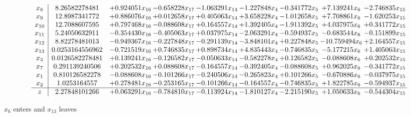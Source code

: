 \documentclass[10pt]{article}
\begin{document}
 \[\begin{array}{c| c c@{\hskip 2pt} c@{\hskip 2pt} c@{\hskip 2pt} c@{\hskip 2pt} c@{\hskip 2pt} c@{\hskip 2pt} c@{\hskip 2pt} }
 x_{8}   &  8.26582278481 & + 0.924051 x_{16} & -0.658228 x_{17} & -1.063291 x_{14} & -1.227848 x_{4} & -0.341772 x_{5} & + 7.139241 x_{6} & -2.746835 x_{15}\\
 x_{9}   &  12.8987341772 & + 0.886076 x_{16} & + 0.012658 x_{17} & + 0.405063 x_{14} & + 3.658228 x_{4} & -1.012658 x_{5} & + 7.708861 x_{6} & -1.620253 x_{15}\\
 x_{10}   &  12.7088607595 & + 0.797468 x_{16} & -0.088608 x_{17} & + 0.164557 x_{14} & + 1.392405 x_{4} & -1.911392 x_{5} & + 4.037975 x_{6} & + 0.341772 x_{15}\\
 x_{11}   &  5.24050632911 & -0.354430 x_{16} & -0.405063 x_{17} & + 0.037975 x_{14} & -2.063291 x_{4} & -0.594937 x_{5} & -0.683544 x_{6} & -0.151899 x_{15}\\
 x_{12}   &  8.82278481013 & -0.949367 x_{16} & -0.227848 x_{17} & -0.291139 x_{14} & -3.848101 x_{4} & + 0.227848 x_{5} & -10.759494 x_{6} & + 2.164557 x_{15}\\
 x_{13}   &  0.0253164556962 & -0.721519 x_{16} & + 0.746835 x_{17} & + 0.898734 x_{14} & + 4.835443 x_{4} & -0.746835 x_{5} & -5.177215 x_{6} & + 1.405063 x_{15}\\
 x_{3}   &  0.0126582278481 & + 0.139241 x_{16} & -0.126582 x_{17} & -0.050633 x_{14} & -0.582278 x_{4} & + 0.126582 x_{5} & -0.088608 x_{6} & + 0.202532 x_{15}\\
 x_{7}   &  0.291139240506 & + 0.202532 x_{16} & + 0.088608 x_{17} & -0.164557 x_{14} & -0.392405 x_{4} & -0.088608 x_{5} & + 0.962025 x_{6} & -0.341772 x_{15}\\
 x_{1}   &  0.810126582278 & -0.088608 x_{16} & -0.101266 x_{17} & -0.240506 x_{14} & -0.265823 x_{4} & + 0.101266 x_{5} & -0.670886 x_{6} & -0.037975 x_{15}\\
 x_{2}   &  1.0253164557 & + 0.278481 x_{16} & -0.253165 x_{17} & -0.101266 x_{14} & -0.164557 x_{4} & -0.746835 x_{5} & + 1.822785 x_{6} & -0.594937 x_{15}\\
\hline
z    &  2.27848101266 & + 0.063291 x_{16} & -0.784810 x_{17} & -0.113924 x_{14} & -1.810127 x_{4} & -2.215190 x_{5} & + 1.050633 x_{6} & -0.544304 x_{15}\\
\end{array}\]


 $ x_{6} $ enters and $ x_{13} $ leaves 
\end{document}
